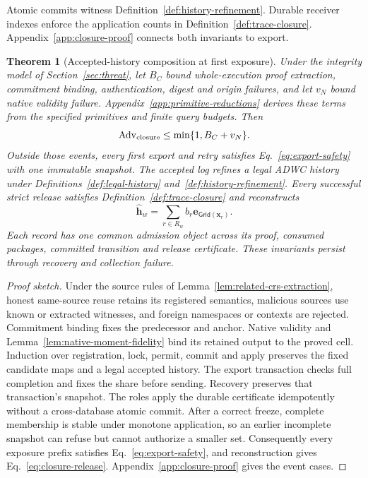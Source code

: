 \documentclass[conference,compsoc]{IEEEtran}
\theoremstyle{definition}
\numberwithin{equation}{section}
\numberwithin{table}{section}
\numberwithin{figure}{section}
\theoremstyle{plain}
\newtheorem{theorem}{Theorem}[section]
\newtheorem{theorem}{Theorem}
\begin{document}
\label{lem:main-boundary-composition}
Atomic commits witness Definition~\ref{def:history-refinement}.
Durable receiver indexes enforce the application counts in
Definition~\ref{def:trace-closure}. Appendix~\ref{app:closure-proof}
connects both invariants to export.

\begin{theorem}[Accepted-history composition at first exposure]
\label{thm:main-semantic-closure}
Under the integrity model of Section~\ref{sec:threat}, let \(B_C\) bound
whole-execution proof extraction, commitment binding, authentication, digest
and origin failures, and let \(v_N\) bound native validity failure.
Appendix~\ref{app:primitive-reductions} derives these terms from the
specified primitives and finite query budgets. Then
\begin{equation}
 \operatorname{Adv}_{\rm closure}\le\min\{1,B_C+v_N\}.
 \label{eq:primitive-bounds}
\end{equation}
Outside those events, every first export and retry satisfies
Eq.~\eqref{eq:export-safety} with one immutable snapshot.
The accepted log refines a legal ADWC history under Definitions~\ref{def:legal-history} and~\ref{def:history-refinement}. Every successful
strict release satisfies Definition~\ref{def:trace-closure} and reconstructs
\begin{equation}
 \hat{\mathbf h}_w=\sum_{r\in R_w}b_r\mathbf e_{\mathsf{Grid}(\mathbf x_r)}.
 \label{eq:closure-release}
\end{equation}
Each record has one common admission object across its proof, consumed
packages, committed transition and release certificate. These invariants
persist through recovery and collection failure.
\end{theorem}
\begin{proof}[Proof sketch]
Under the source rules of Lemma~\ref{lem:related-crs-extraction}, honest
same-source reuse retains its registered semantics, malicious sources use known
or extracted witnesses, and foreign namespaces or contexts are rejected.
Commitment binding fixes the predecessor and anchor. Native validity and Lemma~\ref{lem:native-moment-fidelity}
bind its retained output to the proved cell. Induction over registration,
lock, permit, commit and apply preserves the fixed candidate maps and a legal
accepted history. The export transaction checks full completion and fixes
the share before sending. Recovery preserves that transaction's snapshot. The roles apply the durable
certificate idempotently without a cross-database atomic commit. After a
correct freeze, complete membership is stable under monotone application, so
an earlier incomplete snapshot can refuse but cannot authorize a smaller set.
Consequently every exposure prefix satisfies Eq.~\eqref{eq:export-safety},
and reconstruction gives Eq.~\eqref{eq:closure-release}.
Appendix~\ref{app:closure-proof} gives the event cases.
\end{proof}
\end{document}
